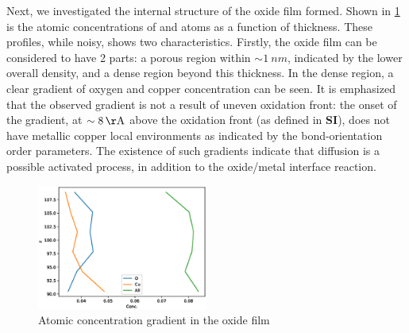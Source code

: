 \documentclass[manuscript=cmatex]{achemso}
\begin{document}
Next, we investigated the internal structure of the oxide film formed. Shown in \cref{fig:conc_grad} is the atomic concentrations of  and  atoms as a function of thickness. These profiles, while noisy, shows two characteristics. Firstly, the oxide film can be considered to have 2 parts: a porous region within $\sim \SI{1}{nm}$, indicated by the lower overall density, and a dense region beyond this thickness. In the dense region, a clear gradient of oxygen and copper concentration can be seen. It is emphasized that the observed gradient is not a result of uneven oxidation front: the onset of the gradient, at $\sim\SI{8}{\AA}$ above the oxidation front (as defined in \textbf{SI}), does not have metallic copper local environments as indicated by the bond-orientation order parameters. The existence of such gradients indicate that diffusion is a possible activated process, in addition to the oxide/metal interface reaction. 
\begin{figure}[h]
  \centering
  \includegraphics[width=0.5\textwidth]{conc_grad.eps} %
  \caption[Concentration gradient]{Atomic concentration gradient in the oxide film}
  \label{fig:conc_grad}
\end{figure}
\end{document}
